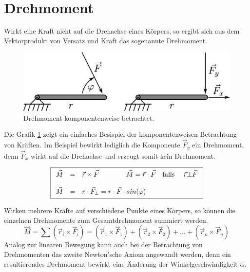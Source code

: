 \section{Drehmoment}
Wirkt eine Kraft nicht auf die Drehachse eines Körpers, so ergibt
sich aus dem Vektorprodukt von Versatz und Kraft das sogenannte
Drehmoment.

\begin{figure}[h!]
	\centering
	\includegraphics[scale=0.8]{drehmoment.pdf}
	\caption{Drehmoment komponentenweise betrachtet.}
	\label{fig:drehmoment}
\end{figure}

\noindent
Die Grafik \ref{fig:drehmoment} zeigt ein einfaches Besispiel der
komponentenweisen Betrachtung von Kräften. Im Beispiel bewirkt lediglich
die Komponente $\vec{F}_y$ ein Drehmoment, denn $\vec{F}_x$ wirkt auf
die Drehachse und erzeugt somit kein Drehmoment.

\[ \boxed{\begin{array}{l c l} 
	\vec{M} &=& \vec{r} \times \vec{F}
			\qquad \qquad
		\vec{M} = \vec{r} \cdot \vec{F}
			\quad \text{falls } \quad \vec{r} \bot \vec{F} \\
	& & \\ 
	\vec{M} 
		&=& r \cdot \vec{F}_\bot 
		= r \cdot \vec{F} \cdot sin(\varphi) \\
\end{array} }\]

\noindent
Wirken mehrere Kräfte auf verschiedene Punkte eines Körpers, so können
die einzelnen Drehmomente zum Gesamtdrehmoment summiert werden.
\[ \boxed{
	\vec{M} = \sum \left(\vec{r}_i \times \vec{F}_i\right)
	= \left(\vec{r}_1 \times \vec{F}_1 \right)
		+ \left( \vec{r}_2 \times \vec{F}_2 \right)
		+ \dots 
		+ \left( \vec{r}_n \times \vec{F}_n \right)
} \]
Analog zur linearen Bewegung kann auch bei der Betrachtung von Drehmomenten
das zweite Newton'sche Axiom angewandt werden, denn ein resultierendes
Drehmoment bewirkt eine Änderung der Winkelgeschwindigkeit $\alpha$.

